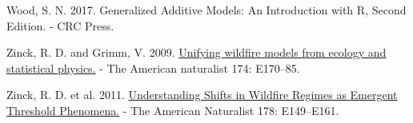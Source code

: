 \documentclass[
]{article}
\newlength{\cslhangindent}
\newenvironment{CSLReferences}[2] %
 {\begin{list}{}{%
  \setlength{\itemindent}{0pt}
  \setlength{\leftmargin}{0pt}
  \setlength{\parsep}{0pt}
  \ifodd #1
   \setlength{\leftmargin}{\cslhangindent}
   \setlength{\itemindent}{-1\cslhangindent}
  \fi
  \setlength{\itemsep}{#2\baselineskip}}}
 {\end{list}}
\begin{document}
\begin{CSLReferences}{1}{1}
Wood, S. N. 2017. Generalized {Additive Models}: {An Introduction} with
{R}, {Second Edition}. - {CRC Press}.

Zinck, R. D. and Grimm, V. 2009.
\href{https://doi.org/10.1086/605959}{Unifying wildfire models from
ecology and statistical physics.} - The American naturalist 174:
E170--85.

Zinck, R. D. et al. 2011.
\href{https://doi.org/10.1086/662675}{Understanding {Shifts} in
{Wildfire Regimes} as {Emergent Threshold Phenomena}.} - The American
Naturalist 178: E149--E161.

\end{CSLReferences}
\end{document}
